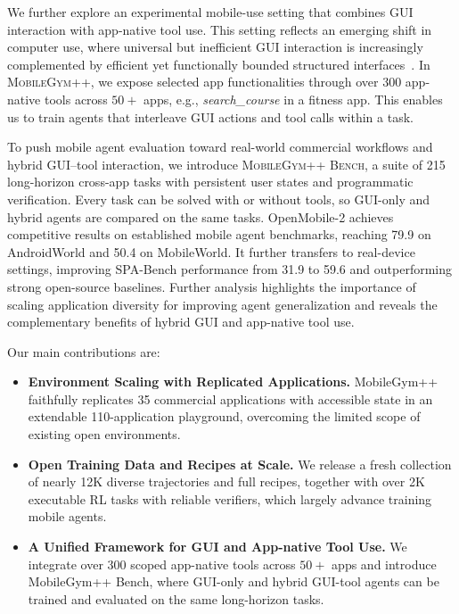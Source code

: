 We further explore an experimental mobile-use setting that combines GUI interaction with app-native tool use. This setting reflects an emerging shift in computer use, where universal but inefficient GUI interaction is increasingly complemented by efficient yet functionally bounded structured interfaces~\citep{hu2026toolcua, shi2026cua}. In \textsc{MobileGym++}, we expose selected app functionalities through over $300$ app-native tools across $50+$ apps, e.g., \textit{search\_course} in a fitness app. This enables us to train agents that interleave GUI actions and tool calls within a task.


To push mobile agent evaluation toward real-world commercial workflows and hybrid GUI--tool interaction, we introduce \textsc{MobileGym++ Bench}, a suite of 215 long-horizon cross-app tasks with persistent user states and programmatic verification. Every task can be solved with or without tools, so GUI-only and hybrid agents are compared on the same tasks.
OpenMobile-2 achieves competitive results on established mobile agent benchmarks, reaching 79.9 on AndroidWorld and 50.4 on MobileWorld.
It further transfers to real-device settings, improving SPA-Bench performance from 31.9 to 59.6 and outperforming strong open-source baselines.
Further analysis highlights the importance of scaling application diversity for improving agent generalization and reveals the complementary benefits of hybrid GUI and app-native tool use.


Our main contributions are:
\begin{itemize}[leftmargin=2em, itemsep=2pt, topsep=0pt, parsep=0pt]

\item \textbf{Environment Scaling with Replicated Applications.}  MobileGym++ faithfully replicates 35 commercial applications with accessible state in an extendable 110-application playground, overcoming the limited scope of existing open environments.

\item \textbf{Open Training Data and Recipes at Scale.}
We release a fresh collection of nearly 12K diverse trajectories and full recipes, together with over 2K executable RL tasks with reliable verifiers, which largely advance training mobile agents.

\item \textbf{A Unified Framework for GUI and App-native Tool Use.} We integrate over $300$ scoped app-native tools across $50+$ apps and introduce MobileGym++ Bench, where GUI-only and hybrid GUI-tool agents can be trained and evaluated on the same long-horizon tasks. 

\end{itemize}